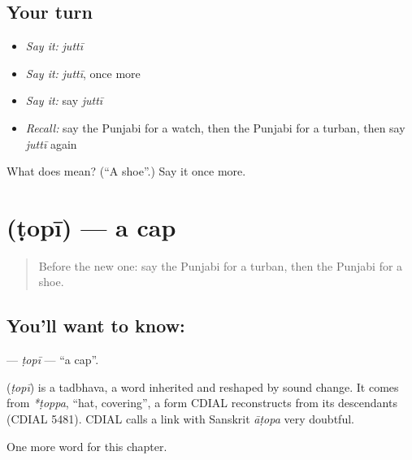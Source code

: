 \subsection*{Your turn}
\begin{itemize}
\raggedright
  \item \emph{Say it:} \emph{juttī}
  \item \emph{Say it:} \emph{juttī}, once more
  \item \emph{Say it:} say \emph{juttī}
  \item \emph{Recall:} say the Punjabi for a watch, then the Punjabi for a turban, then say \emph{juttī} again
\end{itemize}

\begin{tcolorbox}[breakable,colback=teal!4,colframe=teal!35!black,title={Before you move on}]
What does  mean? (\textquotedblleft{}A shoe\textquotedblright{}.) Say it once more.
\end{tcolorbox}
\section[\texorpdfstring{\pa{ਟੋਪੀ} (ṭopī)}{ਟੋਪੀ (ṭopī)}]{ (ṭopī) — a cap}

\label{lesson:PA-C94-topi}



\begin{quote}
Before the new one: say the Punjabi for a turban, then the Punjabi for a shoe.
\end{quote}

\subsection*{You'll want to know: }
\textbf{} — \emph{ṭopī} — \textquotedblleft{}a cap\textquotedblright{}.

\begin{cousinweb}
\textbf{} (\emph{ṭopī}) is a tadbhava, a word inherited and reshaped by sound change. It comes from \emph{*ṭoppa}, \textquotedblleft{}hat, covering\textquotedblright{}, a form CDIAL reconstructs from its descendants (CDIAL 5481). CDIAL calls a link with Sanskrit \emph{āṭopa} very doubtful.
\end{cousinweb}

\begin{grammarlens}[title={What you've built}]
One more word for this chapter.
\end{grammarlens}

